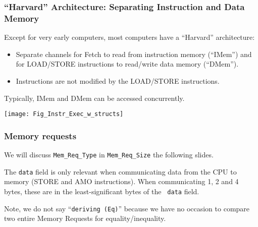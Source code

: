\begin{frame}[fragile]
\frametitle{``Harvard'' Architecture: Separating Instruction and Data Memory}

\footnotesize

\begin{minipage}{0.35\textwidth}
 Except for very early computers, most computers have a ``Harvard'' architecture:
 \begin{itemize}

  \item Separate channels for Fetch to read from instruction memory (``IMem'')
        and for LOAD/STORE instructions to read/write data memory (``DMem'').

  \item Instructions are not modified by the LOAD/STORE instructions.

 \end{itemize}
 Typically, IMem and DMem can be accessed concurrently.
\end{minipage}
\hm
\begin{minipage}{0.6\textwidth}
 \begin{center}
  \texttt{[image: Fig\_Instr\_Exec\_w\_structs]}
 \end{center}
\end{minipage}

\end{frame}


\begin{frame}[fragile]
\frametitle{Memory requests}

\footnotesize


\vspace{2ex}

We will discuss {\tt Mem\_Req\_Type} in {\tt Mem\_Req\_Size} the following slides.

\vspace{1ex}

The {\tt data} field is only relevant when communicating data from the
CPU to memory (STORE and AMO instructions).  When communicating 1, 2
and 4 bytes, these are in the least-significant bytes of the {\tt
data} field.

\PAUSE{\vspace{4ex}}

Note, we do not say ``{\tt deriving (Eq)}'' because we have no
occasion to compare two entire Memory Requests for
equality/inequality.

\end{frame}

